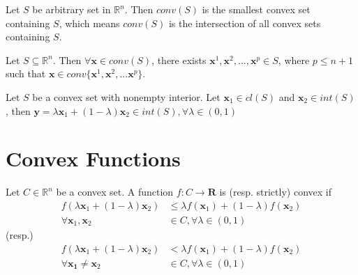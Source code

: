 				\begin{lemma}
					Let $S$ be arbitrary set in $\mathbb{R}^n$. Then $conv(S)$ is the smallest convex set containing $S$, which means $conv(S)$ is the intersection of all convex sets containing $S$.
				\end{lemma}

				\begin{theorem}
					Let $S \subseteq \mathbb{R}^n$. Then $\forall \mathbf{x} \in conv(S)$, there exists $\mathbf{x}^1, \mathbf{x}^2, ..., \mathbf{x}^p \in S$, where $p\le n+1$ such that $\mathbf{x} \in conv\{\mathbf{x}^1, \mathbf{x}^2, ... \mathbf{x}^p\}$.
				\end{theorem}


				\begin{theorem}
					Let $S$ be a convex set with nonempty interior. Let $\mathbf{x}_1 \in cl(S)$ and $\mathbf{x}_2 \in int(S)$, then $\mathbf{y} = \lambda \mathbf{x}_1 + (1 - \lambda) \mathbf{x}_2 \in int(S), \forall \lambda \in (0, 1)$
				\end{theorem}

			\section{Convex Functions}
				\begin{definition}
					Let $C \in \mathbb{R}^n$ be a convex set. A function $f: C \rightarrow \mathbf{R}$ is (resp. strictly) convex if
					\begin{align}
						f(\lambda \mathbf{x}_1 + (1 - \lambda) \mathbf{x}_2) &\le \lambda f(\mathbf{x}_1) + (1 - \lambda) f(\mathbf{x}_2) \\ \forall \mathbf{x}_1, \mathbf{x}_2 &\in C, \forall \lambda \in (0, 1)
					\end{align}
					(resp.)
					\begin{align}
						f(\lambda \mathbf{x}_1 + (1 - \lambda) \mathbf{x}_2) &< \lambda f(\mathbf{x}_1) + (1 - \lambda) f(\mathbf{x}_2) \\ \forall \mathbf{x_1} \neq \mathbf{x}_2 &\in C, \forall \lambda \in (0, 1)
					\end{align}
				\end{definition}


